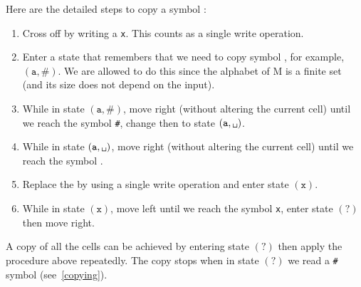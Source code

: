 \documentclass{article}
\newcommand\obullet[1]{\ThisStyle{\ensurestackMath{%
  \stackon[1pt]{\SavedStyle#1}{\SavedStyle\kern.6\LMpt\bullet}}}}
\newcommand{\0}{\texttt{\textvisiblespace}}
\newcommand{\°}{\obullet{\0}}
\newcommand{\s}{\texttt{a}}
\newcommand{\X}{\texttt{x}}
\newcommand{\e}{\texttt{\#}}
\begin{document}
Here are the detailed steps to copy a symbol \obullet{\s}:
\begin{enumerate}
	\item Cross off \obullet{\s} by writing a \X{}. This
		counts as a single write operation.
	\item Enter a state that remembers that we need to copy symbol
		\obullet{\s}, for example, \((\s,\e)\). We are allowed
		to do this since the alphabet of M is a finite set (and its size does not
		depend on the input).
	\item While in state \((\s,\e)\), move right (without
		altering the current cell) until we reach
		the symbol \e, change then to state
		\((\s,\0{})\).
	\item While in state \((\s,\0{})\), move right (without
	altering the current cell) until we reach the symbol \0{}.
	\item Replace the \0{} by \obullet{\s} using a
		single write operation and enter state \((\texttt{x})\).
	\item While in state \((\texttt{x})\), move left until we reach
		the symbol \X{}, enter state \((\texttt{?})\)
		then move right.
\end{enumerate}
A copy of all the cells can be achieved by entering state \((\texttt{?})\)
then apply the procedure above repeatedly.
The copy stops when in state \((\texttt{?})\) we read a \e{}
symbol (see~\ref{copying}).
\end{document}
